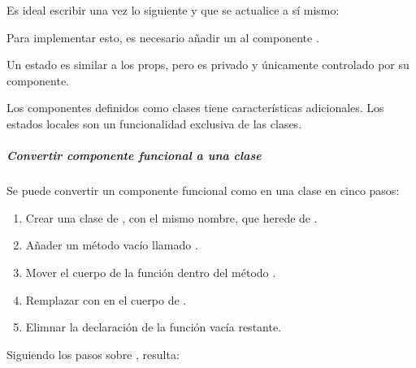 Es ideal escribir una vez lo siguiente y que  se actualice a sí mismo:

%
\begin{sphinxVerbatim}[commandchars=\\\{\}]
   
\end{sphinxVerbatim}

Para implementar esto, es necesario añadir un  al componente .

Un estado es similar a los props, pero es privado y únicamente controlado por su
componente.

Los componentes definidos como clases tiene características adicionales. Los
estados locales son un funcionalidad exclusiva de las clases.


\subparagraph{Convertir componente funcional a una clase}
\label{\detokenize{reactjs:convertir-componente-funcional-a-una-clase}}
Se puede convertir un componente funcional como  en una clase en
cinco pasos:
\begin{enumerate}
\item {} 
Crear una clase de , con el mismo nombre, que herede de .

\item {} 
Añader un método vacío llamado .

\item {} 
Mover el cuerpo de la función dentro del método .

\item {} 
Remplazar  con  en el cuerpo de .

\item {} 
Elimnar la declaración de la función vacía restante.

\end{enumerate}

Siguiendo los pasos sobre , resulta:

